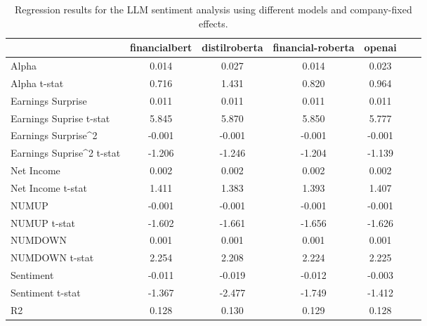 \begin{table}
\caption{Regression results for the LLM sentiment analysis using different models and company-fixed effects.}
\label{tab:llm_regressions_company_fixed}
\begin{tabular}{lcccccc}
\toprule
 & financialbert & distilroberta & financial-roberta & openai \\
\midrule
Alpha & 0.014 & 0.027 & 0.014 & 0.023 \\
Alpha t-stat & 0.716 & 1.431 & 0.820 & 0.964 \\
Earnings Surprise & 0.011 & 0.011 & 0.011 & 0.011 \\
Earnings Suprise t-stat & 5.845 & 5.870 & 5.850 & 5.777 \\
Earnings Surprise^2 & -0.001 & -0.001 & -0.001 & -0.001 \\
Earnings Suprise^2 t-stat & -1.206 & -1.246 & -1.204 & -1.139 \\
Net Income & 0.002 & 0.002 & 0.002 & 0.002 \\
Net Income t-stat & 1.411 & 1.383 & 1.393 & 1.407 \\
NUMUP & -0.001 & -0.001 & -0.001 & -0.001 \\
NUMUP t-stat & -1.602 & -1.661 & -1.656 & -1.626 \\
NUMDOWN & 0.001 & 0.001 & 0.001 & 0.001 \\
NUMDOWN t-stat & 2.254 & 2.208 & 2.224 & 2.225 \\
Sentiment & -0.011 & -0.019 & -0.012 & -0.003 \\
Sentiment t-stat & -1.367 & -2.477 & -1.749 & -1.412 \\
R2 & 0.128 & 0.130 & 0.129 & 0.128 \\
\bottomrule
\end{tabular}
\end{table}

